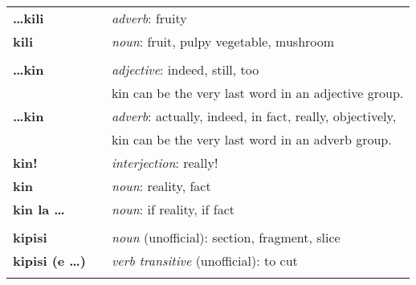 \begin{supertabular}{p{2,5cm}|ll}
    \textbf{\dots kili}          &  & \textit{adverb}: fruity                                                                                    \\
    \textbf{kili}                &  & \textit{noun}: fruit, pulpy vegetable, mushroom                                                            \\
                                 &  &                                                                                                            \\
    \textbf{\dots kin}           &  & \textit{adjective}: indeed, still, too                                                                     \\
                                 &  & kin can be the very last word in an adjective group.                                                       \\
    \textbf{\dots kin}           &  & \textit{adverb}: actually, indeed, in fact, really, objectively,                                           \\
                                 &  & kin can be the very last word in an adverb group.                                                          \\
    \textbf{kin!}                &  & \textit{interjection}: really!                                                                             \\
    \textbf{kin}                 &  & \textit{noun}: reality, fact                                                                               \\
    \textbf{kin la \dots}        &  & \textit{noun}: if reality, if fact                                                                         \\
                                 &  &                                                                                                            \\
    \textbf{kipisi }             &  & \textit{noun} (unofficial): section, fragment, slice                                                       \\
    \textbf{kipisi (e \dots)}    &  & \textit{verb transitive} (unofficial): to cut                                                              \\
                                 &  &                                                                                                            \\

\end{supertabular}
